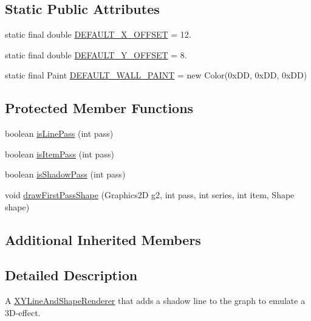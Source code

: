 \subsection*{Static Public Attributes}
\begin{DoxyCompactItemize}
\item 
static final double \mbox{\hyperlink{classorg_1_1jfree_1_1chart_1_1renderer_1_1xy_1_1_x_y_line3_d_renderer_afdc87e05dc4d0df43d89f46cb0eb0a6e}{D\+E\+F\+A\+U\+L\+T\+\_\+\+X\+\_\+\+O\+F\+F\+S\+ET}} = 12.
\item 
static final double \mbox{\hyperlink{classorg_1_1jfree_1_1chart_1_1renderer_1_1xy_1_1_x_y_line3_d_renderer_a603734f0f11f69ad5023d8b6409590d4}{D\+E\+F\+A\+U\+L\+T\+\_\+\+Y\+\_\+\+O\+F\+F\+S\+ET}} = 8.
\item 
static final Paint \mbox{\hyperlink{classorg_1_1jfree_1_1chart_1_1renderer_1_1xy_1_1_x_y_line3_d_renderer_a942ce3be98e49fc81c5e4ecf109a8349}{D\+E\+F\+A\+U\+L\+T\+\_\+\+W\+A\+L\+L\+\_\+\+P\+A\+I\+NT}} = new Color(0x\+D\+D, 0x\+D\+D, 0x\+D\+D)
\end{DoxyCompactItemize}
\subsection*{Protected Member Functions}
\begin{DoxyCompactItemize}
\item 
boolean \mbox{\hyperlink{classorg_1_1jfree_1_1chart_1_1renderer_1_1xy_1_1_x_y_line3_d_renderer_acdc51b8df3f7d1fc0f063d1d8f8c71e3}{is\+Line\+Pass}} (int pass)
\item 
boolean \mbox{\hyperlink{classorg_1_1jfree_1_1chart_1_1renderer_1_1xy_1_1_x_y_line3_d_renderer_a3702ee5d68609c8b4ac0cbef2cb62f18}{is\+Item\+Pass}} (int pass)
\item 
boolean \mbox{\hyperlink{classorg_1_1jfree_1_1chart_1_1renderer_1_1xy_1_1_x_y_line3_d_renderer_a3c5a020aafa9768f8b4b08292ddf49c3}{is\+Shadow\+Pass}} (int pass)
\item 
void \mbox{\hyperlink{classorg_1_1jfree_1_1chart_1_1renderer_1_1xy_1_1_x_y_line3_d_renderer_a3afe1082fcb01cf20ff02393472908a2}{draw\+First\+Pass\+Shape}} (Graphics2D g2, int pass, int series, int item, Shape shape)
\end{DoxyCompactItemize}
\subsection*{Additional Inherited Members}


\subsection{Detailed Description}
A \mbox{\hyperlink{classorg_1_1jfree_1_1chart_1_1renderer_1_1xy_1_1_x_y_line_and_shape_renderer}{X\+Y\+Line\+And\+Shape\+Renderer}} that adds a shadow line to the graph to emulate a 3\+D-\/effect. 

